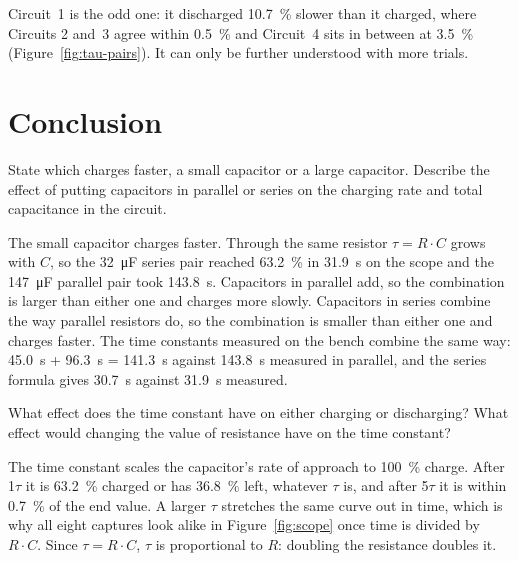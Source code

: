 \documentclass[offwhitecover]{lennylab}
\newcommand{\ntau}[1]{#1\(\tau\)}   %
\newcommand{\RC}{\mbox{\(R \cdot C\)}}
\begin{document}
Circuit~1 is the odd one: it discharged \qty{10.7}{\percent} slower than it charged, where Circuits 2 and~3 agree within \qty{0.5}{\percent} and Circuit~4 sits in between at \qty{3.5}{\percent} (Figure~\ref{fig:tau-pairs}). It can only be further understood with more trials.

\section*{Conclusion}

\begin{marginfigure}
  
  \caption{\Ceq{} formulas for capacitors in both series and parallel. Both formulas (except for the series capacitance shortcut shown) are associative and commutative, and can therefore be repeated for an arbitrary number of elements.}
  \label{fig:ceq}
\end{marginfigure}

\begin{question}
  State which charges faster, a small capacitor or a large capacitor. Describe the effect of putting capacitors in parallel or series on the charging rate and total capacitance in the circuit.
\end{question}
\begin{answer}
  The small capacitor charges faster. Through the same resistor $\tau = R \cdot C$ grows with $C$, so the \qty{32}{\micro\farad} series pair reached \qty{63.2}{\percent} in \qty{31.9}{\second} on the scope and the \qty{147}{\micro\farad} parallel pair took \qty{143.8}{\second}. Capacitors in parallel add, so the combination is larger than either one and charges more slowly. Capacitors in series combine the way parallel resistors do, so the combination is smaller than either one and charges faster. The time constants measured on the bench combine the same way: \qty{45.0}{\second} + \qty{96.3}{\second} = \qty{141.3}{\second} against \qty{143.8}{\second} measured in parallel, and the series formula gives \qty{30.7}{\second} against \qty{31.9}{\second} measured.
\end{answer}

\begin{question}
  What effect does the time constant have on either charging or discharging? What effect would changing the value of resistance have on the time constant?
\end{question}
\begin{answer}
  The time constant scales the capacitor's rate of approach to \qty{100}{\percent} charge. After \ntau{1} it is \qty{63.2}{\percent} charged or has \qty{36.8}{\percent} left, whatever $\tau$ is, and after \ntau{5} it is within \qty{0.7}{\percent} of the end value. A larger $\tau$ stretches the same curve out in time, which is why all eight captures look alike in Figure~\ref{fig:scope} once time is divided by \RC. Since $\tau = R \cdot C$, $\tau$ is proportional to $R$: doubling the resistance doubles it.
\end{answer}
\end{document}
